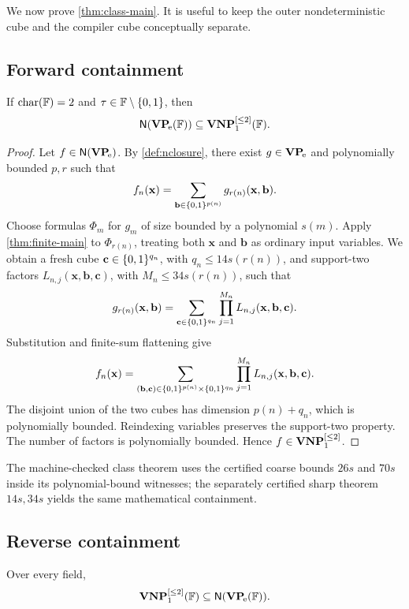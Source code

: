 We now prove \cref{thm:class-main}.  It is useful to keep the outer nondeterministic cube
and the compiler cube conceptually separate.

\subsection{Forward containment}

\begin{proposition}\label{prop:forward}
If \(\operatorname{char}(\mathbb{F})=2\) and \(\tau\in\mathbb{F}\setminus\{0,1\}\), then
\[
  \mathsf{N}(\mathbf{VP}_{\!\mathrm e}(\mathbb{F}))\subseteq\mathbf{VNP}_{1}^{[\le 2]}(\mathbb{F}).
\]
\end{proposition}

\begin{proof}
Let \(f\in\mathsf{N}(\mathbf{VP}_{\!\mathrm e})\).  By \cref{def:nclosure}, there exist
\(g\in\mathbf{VP}_{\!\mathrm e}\) and polynomially bounded \(p,r\) such that
\[
 f_n(\mathbf{x})
 =\sum_{\mathbf{b}\in\{0,1\}^{p(n)}}
   g_{r(n)}(\mathbf{x},\mathbf{b}).
\]
Choose formulas \(\Phi_m\) for \(g_m\) of size bounded by a polynomial \(s(m)\).  Apply
\cref{thm:finite-main} to \(\Phi_{r(n)}\), treating both \(\mathbf{x}\) and
\(\mathbf{b}\) as ordinary input variables.  We obtain a fresh cube
\(\mathbf{c}\in\{0,1\}^{q_n}\), with \(q_n\le14s(r(n))\), and support-two factors
\(L_{n,j}(\mathbf{x},\mathbf{b},\mathbf{c})\), with
\(M_n\le34s(r(n))\), such that
\[
 g_{r(n)}(\mathbf{x},\mathbf{b})
 =\sum_{\mathbf{c}\in\{0,1\}^{q_n}}
   \prod_{j=1}^{M_n}L_{n,j}(\mathbf{x},\mathbf{b},\mathbf{c}).
\]
Substitution and finite-sum flattening give
\[
 f_n(\mathbf{x})
 =\sum_{(\mathbf{b},\mathbf{c})\in\{0,1\}^{p(n)}\times\{0,1\}^{q_n}}
   \prod_{j=1}^{M_n}L_{n,j}(\mathbf{x},\mathbf{b},\mathbf{c}).
\]
The disjoint union of the two cubes has dimension \(p(n)+q_n\), which is polynomially
bounded.  Reindexing variables preserves the support-two property.  The number of factors
is polynomially bounded.  Hence \(f\in\mathbf{VNP}_{1}^{[\le 2]}\).
\end{proof}

The machine-checked class theorem uses the certified coarse bounds \(26s\) and \(70s\)
inside its polynomial-bound witnesses; the separately certified sharp theorem
\(14s,34s\) yields the same mathematical containment.

\subsection{Reverse containment}

\begin{proposition}\label{prop:reverse}
Over every field,
\[
  \mathbf{VNP}_{1}^{[\le 2]}(\mathbb{F})\subseteq\mathsf{N}(\mathbf{VP}_{\!\mathrm e}(\mathbb{F})).
\]
\end{proposition}

